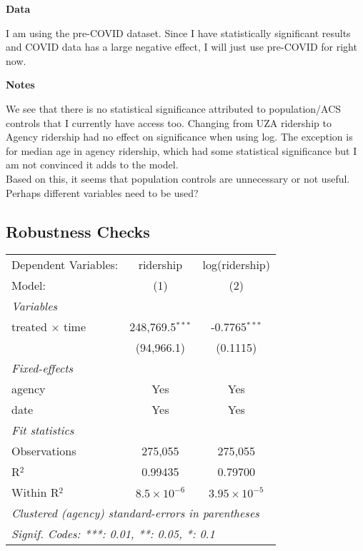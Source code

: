 \documentclass [11pt]{article}
\begin{document}
\textbf{Data}

I am using the pre-COVID dataset. Since I have statistically significant results and COVID data has a large negative effect, I will just use pre-COVID for right now.

\textbf{Notes}

We see that there is no statistical significance attributed to population/ACS controls that I currently have access too. Changing from UZA ridership to Agency ridership had no effect on significance when using log. The exception is for median age in agency ridership, which had some statistical significance but I am not convinced it adds to the model.\\
Based on this, it seems that population controls are unnecessary or not useful. Perhaps different variables need to be used?

\subsection*{Robustness Checks}
\begingroup
\centering
\begin{tabular}{lcc}
   \tabularnewline \midrule \midrule
   Dependent Variables:   & ridership            & log(ridership)\\  
   Model:                 & (1)                  & (2)\\  
   \midrule
   \emph{Variables}\\
   treated $\times$ time  & 248,769.5$^{***}$    & -0.7765$^{***}$\\   
                          & (94,966.1)           & (0.1115)\\   
   \midrule
   \emph{Fixed-effects}\\
   agency                 & Yes                  & Yes\\  
   date                   & Yes                  & Yes\\  
   \midrule
   \emph{Fit statistics}\\
   Observations           & 275,055              & 275,055\\  
   R$^2$                  & 0.99435              & 0.79700\\  
   Within R$^2$           & $8.5\times 10^{-6}$  & $3.95\times 10^{-5}$\\   
   \midrule \midrule
   \multicolumn{3}{l}{\emph{Clustered (agency) standard-errors in parentheses}}\\
   \multicolumn{3}{l}{\emph{Signif. Codes: ***: 0.01, **: 0.05, *: 0.1}}\\
\end{tabular}
\par\endgroup
\end{document}
